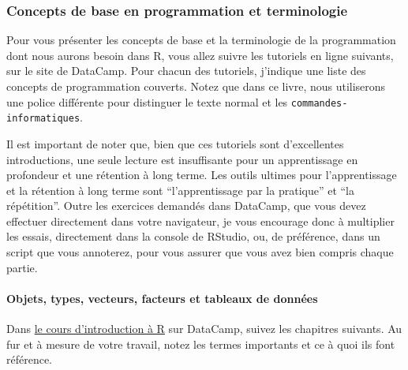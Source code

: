 \documentclass[a4paperpaper,]{article}
\let\oldparagraph\paragraph
\renewcommand{\paragraph}[1]{\oldparagraph{#1}\mbox{}}
\theoremstyle{definition}
\theoremstyle{definition}
\theoremstyle{definition}
\theoremstyle{remark}
\begin{document}
\subsubsection{Concepts de base en programmation et
terminologie}\label{concepts-de-base-en-programmation-et-terminologie}

Pour vous présenter les concepts de base et la terminologie de la
programmation dont nous aurons besoin dans R, vous allez suivre les
tutoriels en ligne suivants, sur le site de DataCamp. Pour chacun des
tutoriels, j'indique une liste des concepts de programmation couverts.
Notez que dans ce livre, nous utiliserons une police différente pour
distinguer le texte normal et les \texttt{commandes-informatiques}.

Il est important de noter que, bien que ces tutoriels sont d'excellentes
introductions, une seule lecture est insuffisante pour un apprentissage
en profondeur et une rétention à long terme. Les outils ultimes pour
l'apprentissage et la rétention à long terme sont ``l'apprentissage par
la pratique'' et ``la répétition''. Outre les exercices demandés dans
DataCamp, que vous devez effectuer directement dans votre navigateur, je
vous encourage donc à multiplier les essais, directement dans la console
de RStudio, ou, de préférence, dans un script que vous annoterez, pour
vous assurer que vous avez bien compris chaque partie.

\paragraph{Objets, types, vecteurs, facteurs et tableaux de
données}\label{objects}

Dans
\href{https://www.datacamp.com/community/open-courses/introduction-a-r}{le
cours d'introduction à R} sur DataCamp, suivez les chapitres suivants.
Au fur et à mesure de votre travail, notez les termes importants et ce à
quoi ils font référence.
\end{document}
